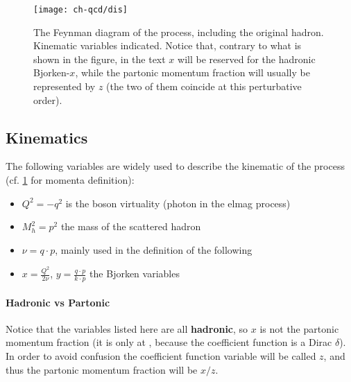 
\begin{figure}
	\centering
	\texttt{[image: ch-qcd/dis]}
	\caption{
    The \lo Feynman diagram of the \dis process, including the original hadron.
    Kinematic variables indicated. Notice that, contrary to what is shown in
    the figure, in the text $x$ will be reserved for the hadronic Bjorken-$x$,
    while the partonic momentum fraction will usually be represented by $z$
    (the two of them coincide at this perturbative order).
  }
	\label{fig:dis/dis}
\end{figure}

\subsection{Kinematics}

The following variables are widely used to describe the kinematic of the \dis
process (cf. \cref{fig:dis/dis} for momenta definition):
\begin{itemize}
  \item $Q^2 = - q^2$ is the \ew boson virtuality (photon in the
    \acrshort{elmag} process)
  \item $M_h^2 = p^2$ the mass of the scattered hadron
  \item $\nu = q \cdot p$, mainly used in the definition of the following
  \item $x = \frac{Q^2}{2\nu}$, $y = \frac{q \cdot p}{k \cdot p}$ the Bjorken
    variables
\end{itemize}

\paragraph{Hadronic vs Partonic} Notice that the variables listed here
are all \textbf{hadronic}, so $x$ is not the partonic momentum fraction (it is only
at \lo , because the coefficient function is a Dirac $\delta$).
In order to avoid confusion the coefficient function variable will be called
$z$, and thus the partonic momentum fraction will be $x/z$.
\newline

